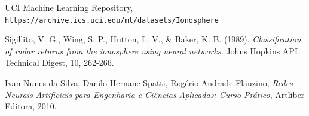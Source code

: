 \documentclass[12pt]{article}
\begin{document}
\begin{thebibliography}{99} 
	
	UCI Machine Learning Repository,\\ \texttt{https://archive.ics.uci.edu/ml/datasets/Ionosphere}
	
	 Sigillito, V. G., Wing, S. P., Hutton, L. V., \& Baker, K. B. (1989). \textit{Classification of radar returns from the ionosphere using neural networks.} Johns Hopkins APL Technical Digest, 10, 262-266.
	
	 Ivan Nunes da Silva, Danilo Hernane Spatti, Rogério Andrade Flauzino, \textit{Redes Neurais Artificiais para Engenharia e Ciências
	Aplicadas: Curso Prático}, Artliber Editora, 2010.
	
	
	
	
\end{thebibliography}
\end{document}
